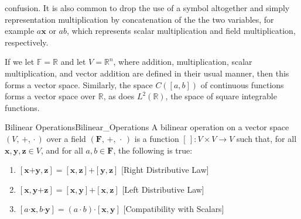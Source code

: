     confusion. It is also common to drop the use of a symbol altogether and
    simply representation multiplication by concatenation of the the
    two variables, for example $a\mathbf{x}$ or $ab$, which represents
    scalar multiplication and field multiplication, respectively.
    \begin{example}
        If we let $\mathbb{F}=\mathbb{R}$ and let
        $V=\mathbb{R}^{n}$, where addition, multiplication, scalar
        multiplication, and vector addition are defined in their usual
        manner, then this forms a vector space. Similarly, the space
        $C([a,b])$ of continuous functions forms a vector space over
        $\mathbb{R}$, as does $L^{2}(\mathbb{R})$, the space of
        square integrable functions.
    \end{example}
    \begin{fdefinition}{Bilinear Operations}{Bilinear_Operations}
        A bilinear operation on a vector space
        $(V,\,\boldsymbol{+},\,\boldsymbol{\cdot}\,)$ over a field
        $(\mathbf{F},\,+,\,\cdot\,)$ is a function
        $[\,]:V\times{V}\rightarrow{V}$ such that, for all
        $\mathbf{x},\mathbf{y},\mathbf{z}\in{V}$, and for all
        $a,b\in\mathbf{F}$, the following is true:
        \begin{enumerate}
            \item $[\mathbf{x}\boldsymbol{+}\mathbf{y}, \mathbf{z}]=%
                   [\mathbf{x},\mathbf{z}]\boldsymbol{+}%
                   [\mathbf{y},\mathbf{z}]$
                  \hfill[Right Distributive Law]
            \item $[\mathbf{x},\mathbf{y}\boldsymbol{+}\mathbf{z}]=%
                   [\mathbf{x},\mathbf{y}]\boldsymbol{+}%
                   [\mathbf{x},\mathbf{z}]$
                  \hfill[Left Distributive Law]
            \item $[a\boldsymbol{\cdot}\mathbf{x},%
                    b\boldsymbol{\cdot}\mathbf{y}]=%
                   (a\cdot{b})\boldsymbol{\cdot}[\mathbf{x},\mathbf{y}]$
                  \hfill[Compatibility with Scalars]
        \end{enumerate}
    \end{fdefinition}
